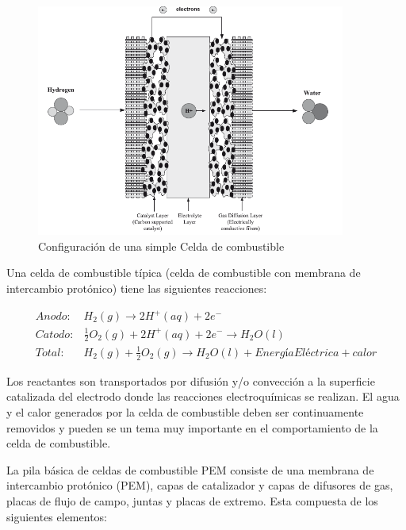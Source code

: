 \documentclass[12pt]{book}
\theoremstyle{definition}
\theoremstyle{remark}
\theoremstyle{plain}
\begin{document}
\begin{figure}
\centering
\includegraphics[width=4in]{Celdasdecombustible.png}
\caption{Configuración de una simple  Celda de combustible}
\label{fig1}
\end{figure}

Una celda de combustible típica (celda de combustible con membrana de intercambio protónico) tiene las siguientes reacciones:


\begin{align*}
Anodo: & H_2 (g) \rightarrow 2 H^{+}(aq)+2 e^{-} \\
Catodo: & \frac{1}{2} O_2 (g) + 2 H^{+}(aq)+2 e^{-} \rightarrow H_{2} O (l) \\
Total: & H_2(g) + \frac{1}{2} O_2 (g) \rightarrow H_{2}O (l)+ Energía Eléctrica+calor 
\end{align*}


Los reactantes son transportados por difusión y/o convección a la superficie  catalizada del electrodo donde las reacciones electroquímicas se realizan. El agua y el calor 
generados por la celda de combustible deben ser continuamente removidos y pueden se un tema muy importante en el comportamiento de la celda de combustible.

La pila básica de celdas de combustible PEM consiste de una membrana de intercambio protónico (PEM), capas de  catalizador y  capas de difusores de gas, placas de flujo de 
campo, juntas y placas de extremo. Esta compuesta de los siguientes elementos:
\end{document}
